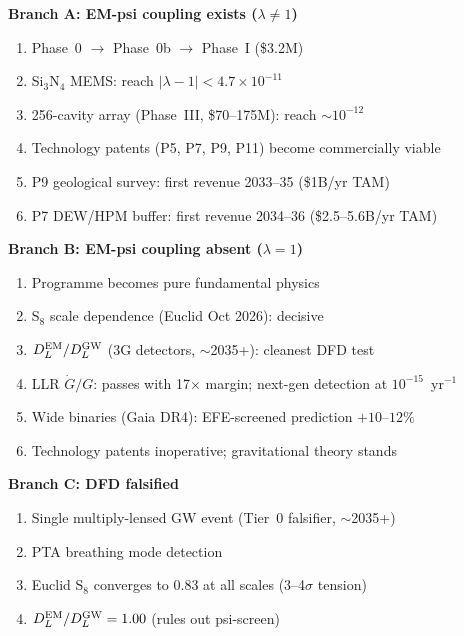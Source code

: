 \documentclass[11pt]{article}
\newcommand{\ee}[1]{\times 10^{#1}}
\newcommand{\lbone}{|\lambda - 1|}
\begin{document}
\begin{tcolorbox}[colback=gray!5!white, colframe=gray!60!black,
  title=\textbf{MASTER DECISION TREE (2026--2030)}]

\textbf{Branch A: EM-psi coupling exists ($\lambda \neq 1$)}
\begin{enumerate}[nosep]
\item Phase~0 $\to$ Phase~0b $\to$ Phase~I (\$3.2M)
\item Si$_3$N$_4$ MEMS: reach $\lbone < 4.7\ee{-11}$
\item 256-cavity array (Phase~III, \$70--175M): reach $\sim 10^{-12}$
\item Technology patents (P5, P7, P9, P11) become commercially viable
\item P9 geological survey: first revenue 2033--35 (\$1B/yr TAM)
\item P7 DEW/HPM buffer: first revenue 2034--36 (\$2.5--5.6B/yr TAM)
\end{enumerate}

\textbf{Branch B: EM-psi coupling absent ($\lambda = 1$)}
\begin{enumerate}[nosep]
\item Programme becomes pure fundamental physics
\item S$_8$ scale dependence (Euclid Oct 2026): decisive
\item $D_L^{\rm EM}/D_L^{\rm GW}$ (3G detectors, $\sim$2035+):
  cleanest DFD test
\item LLR $\dot{G}/G$: passes with 17$\times$ margin; next-gen
  detection at $10^{-15}$~yr$^{-1}$
\item Wide binaries (Gaia DR4): EFE-screened prediction $+10$--$12\%$
\item Technology patents inoperative; gravitational theory stands
\end{enumerate}

\textbf{Branch C: DFD falsified}
\begin{enumerate}[nosep]
\item Single multiply-lensed GW event (Tier~0 falsifier, $\sim$2035+)
\item PTA breathing mode detection
\item Euclid S$_8$ converges to 0.83 at all scales (3--4$\sigma$ tension)
\item $D_L^{\rm EM}/D_L^{\rm GW} = 1.00$ (rules out psi-screen)
\end{enumerate}

\end{tcolorbox}
\end{document}
